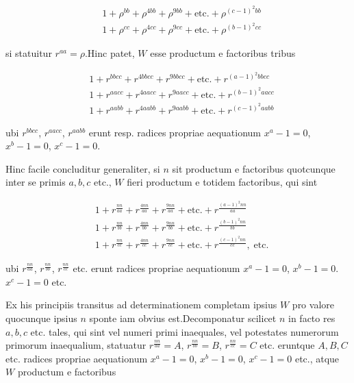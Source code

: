 \[
\begin{aligned}
&1+\rho^{bb}+\rho^{4bb}+\rho^{9bb}+\text{etc.}+\rho^{(c-1)^2bb}\\
&1+\rho^{cc}+\rho^{4cc}+\rho^{9cc}+\text{etc.}+\rho^{(b-1)^2cc}
\end{aligned}
\]

si statuitur $r^{aa}=\rho$.\quad Hinc patet, $W$ esse productum e factoribus tribus

\[
\begin{aligned}
&1+r^{bbcc}+r^{4bbcc}+r^{9bbcc}+\text{etc.}+r^{(a-1)^2bbcc}\\
&1+r^{aacc}+r^{4aacc}+r^{9aacc}+\text{etc.}+r^{(b-1)^2aacc}\\
&1+r^{aabb}+r^{4aabb}+r^{9aabb}+\text{etc.}+r^{(c-1)^2aabb}
\end{aligned}
\]

ubi $r^{bbcc}$, $r^{aacc}$, $r^{aabb}$ erunt resp. radices propriae aequationum $x^a-1=0$, $x^b-1=0$, $x^c-1=0$.


Hinc facile concluditur generaliter, si $n$ sit productum e factoribus quotcunque inter se primis $a,b,c$ etc., $W$ fieri productum e totidem factoribus, qui sint

\[
\begin{aligned}
&1+r^{\frac{nn}{aa}}+r^{\frac{4nn}{aa}}+r^{\frac{9nn}{aa}}+\text{etc.}+r^{\frac{(a-1)^2nn}{aa}}\\
&1+r^{\frac{nn}{bb}}+r^{\frac{4nn}{bb}}+r^{\frac{9nn}{bb}}+\text{etc.}+r^{\frac{(b-1)^2nn}{bb}}\\
&1+r^{\frac{nn}{cc}}+r^{\frac{4nn}{cc}}+r^{\frac{9nn}{cc}}+\text{etc.}+r^{\frac{(c-1)^2nn}{cc}},\;\text{etc.}
\end{aligned}
\]

ubi $r^{\frac{nn}{aa}}$, $r^{\frac{nn}{bb}}$, $r^{\frac{nn}{cc}}$ etc. erunt radices propriae aequationum $x^a-1=0$, $x^b-1=0$. $x^c-1=0$ etc.


Ex his principiis transitus ad determinationem completam ipsius $W$ pro valore quocunque ipsius $n$ sponte iam obvius est.\quad Decomponatur scilicet $n$ in facto%
res $a,b,c$ etc. tales, qui sint vel numeri primi inaequales, vel potestates numerorum primorum inaequalium, statuatur $r^{\frac{nn}{aa}}=A$, $r^{\frac{nn}{bb}}=B$, $r^{\frac{nn}{cc}}=C$ etc. eruntque $A,B,C$ etc. radices propriae aequationum $x^a-1=0$, $x^b-1=0$, $x^c-1=0$ etc., atque $W$ productum e factoribus

